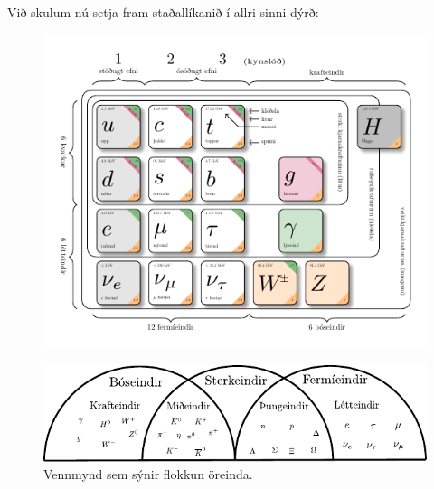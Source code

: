 \ifdefined \wholebook \else\documentclass[oneside]{book}\usepackage{EdlBook}\graphicspath{{figures/}}
\begin{document}
Við skulum nú setja fram staðallíkanið í allri sinni dýrð:

\begin{figure}[H]
    \centering
    \includegraphics[width=.7\textwidth]{figures/standardmodel.pdf}
\end{figure}

\begin{figure}[H]
    \centering
    \includegraphics[scale = 1.25]{figures/jargon-diagram.pdf}
    \caption{Vennmynd sem sýnir flokkun öreinda.}
\end{figure}

\newpage



\ifdefined \wholebook \else
 \printindex
\end{document}
